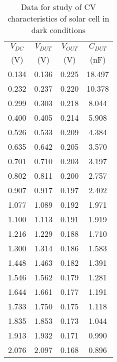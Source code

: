 \begin{table}[]
    \centering
    \begin{tabular}{|c|c|c|c|}
    \hline
    $V_{DC}$ & $V_{DUT}$ & $V_{OUT}$ & $C_{DUT}$ \\ 
    (V) & (V) & (V) & (nF) \\  \hline
    0.134 & 0.136 & 0.225 & 18.497 \\ \hline
    0.232 & 0.237 & 0.220 & 10.378 \\ \hline
    0.299 & 0.303 & 0.218 & 8.044 \\ \hline
    0.400 & 0.405 & 0.214 & 5.908 \\ \hline
    0.526 & 0.533 & 0.209 & 4.384 \\ \hline
    0.635 & 0.642 & 0.205 & 3.570 \\ \hline
    0.701 & 0.710 & 0.203 & 3.197 \\ \hline
    0.802 & 0.811 & 0.200 & 2.757 \\ \hline
    0.907 & 0.917 & 0.197 & 2.402 \\ \hline
    1.077 & 1.089 & 0.192 & 1.971 \\ \hline
    1.100 & 1.113 & 0.191 & 1.919 \\ \hline
    1.216 & 1.229 & 0.188 & 1.710 \\ \hline
    1.300 & 1.314 & 0.186 & 1.583 \\ \hline
    1.448 & 1.463 & 0.182 & 1.391 \\ \hline
    1.546 & 1.562 & 0.179 & 1.281 \\ \hline
    1.644 & 1.661 & 0.177 & 1.191 \\ \hline
    1.733 & 1.750 & 0.175 & 1.118 \\ \hline
    1.835 & 1.853 & 0.173 & 1.044 \\ \hline
    1.913 & 1.932 & 0.171 & 0.990 \\ \hline
    2.076 & 2.097 & 0.168 & 0.896 \\ \hline
    \end{tabular}
    \caption{Data for study of CV characteristics of solar
    cell in dark conditions}
    \label{tab:1}
\end{table}